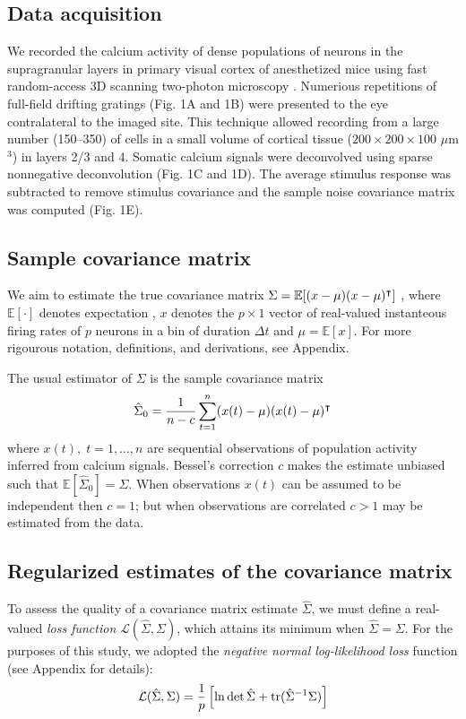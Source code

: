 \subsection*{Data acquisition}
We recorded the calcium activity  of dense populations of neurons in the supragranular layers in primary visual cortex of anesthetized mice using fast random-access 3D scanning two-photon microscopy \cite{Stosiek:2003,Reddy:2005}.  Numerious repetitions of full-field drifting gratings (Fig. 1A and 1B) were presented to the eye contralateral to the imaged site. This technique allowed recording from a large number (150--350) of cells in a small volume of cortical tissue ($200\times200\times100$ $\mu$m$^3$) in layers 2/3 and 4. Somatic calcium signals were deconvolved using  sparse nonnegative deconvolution \cite{Vogelstein:2010} (Fig. 1C and 1D).  The average stimulus response was subtracted to remove stimulus covariance and the sample noise covariance matrix was computed (Fig. 1E).



\subsection*{Sample covariance matrix}
We aim to estimate the true covariance matrix $\Sigma = \mathbb E [(x-\mu)(x-\mu)^\intercal]$ , where $\mathbb E[\cdot]$ denotes expectation , $x$ denotes the $p\times 1$ vector of real-valued instanteous firing rates of $p$ neurons in a bin of duration $\Delta t$ and $\mu = \mathbb E[x]$.  For more rigourous notation, definitions, and derivations, see Appendix. 

The usual estimator of $\Sigma$ is the sample covariance matrix
\begin{equation}
\hat \Sigma_0 = \frac 1 {n-c} \sum\limits_{t=1}^n (x(t)-\mu)(x(t)-\mu)^\intercal 
\end{equation}
where $x(t),\;t=1,\ldots,n$ are sequential observations of population activity inferred from calcium signals. Bessel's correction $c$ makes the estimate unbiased such that $\mathbb E[\hat\Sigma_0] = \Sigma$. When observations $x(t)$ can be assumed to be independent then $c=1$; but when observations are correlated $c>1$ may be estimated from the data. 

\subsection*{Regularized estimates of the covariance matrix}
To assess the quality of a covariance matrix estimate $\hat\Sigma$, we must define a real-valued \emph{loss function} $\mathcal L(\hat\Sigma,\Sigma)$, which attains its minimum when $\hat\Sigma = \Sigma$. For the purposes of this study, we adopted the \emph{negative normal log-likelihood loss} function (see Appendix for details):
\begin{equation}
\mathcal L(\hat\Sigma,\Sigma) = \frac 1 p\left[\ln \det \hat \Sigma + \operatorname{tr}(\hat \Sigma^{-1}\Sigma)\right]
\end{equation}

